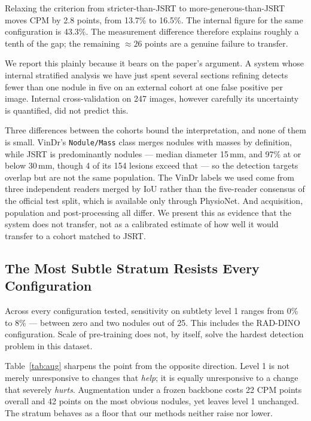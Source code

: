 \documentclass[11pt,a4paper]{article}
\begin{document}
Relaxing the criterion from stricter-than-JSRT to more-generous-than-JSRT moves
CPM by 2.8 points, from 13.7\% to 16.5\%. The internal figure for the same
configuration is 43.3\%. The measurement difference therefore explains roughly a
tenth of the gap; the remaining $\approx26$ points are a genuine failure to
transfer.

We report this plainly because it bears on the paper's argument. A system whose
internal stratified analysis we have just spent several sections refining
detects fewer than one nodule in five on an external cohort at one false
positive per image. Internal cross-validation on 247 images, however carefully
its uncertainty is quantified, did not predict this.

Three differences between the cohorts bound the interpretation, and none of them
is small. VinDr's \texttt{Nodule/Mass} class merges nodules with masses by
definition, while JSRT is predominantly nodules --- median diameter 15\,mm, and
97\% at or below 30\,mm, though 4 of its 154 lesions exceed that --- so the
detection targets overlap but are not the same population. The VinDr labels we used come from three independent readers
merged by IoU rather than the five-reader consensus of the official test split,
which is available only through PhysioNet. And acquisition, population and
post-processing all differ. We present this as evidence that the system does not
transfer, not as a calibrated estimate of how well it would transfer to a cohort
matched to JSRT.

\subsection{The Most Subtle Stratum Resists Every Configuration}
\label{sec:floor}

Across every configuration tested, sensitivity on subtlety level 1 ranges from
0\% to 8\% --- between zero and two nodules out of 25. This includes the
RAD-DINO configuration. Scale of pre-training does not, by itself, solve the
hardest detection problem in this dataset.

Table~\ref{tab:aug} sharpens the point from the opposite direction. Level 1 is
not merely unresponsive to changes that \emph{help}; it is equally unresponsive
to a change that severely \emph{hurts}. Augmentation under a frozen backbone
costs 22 CPM points overall and 42 points on the most obvious nodules, yet
leaves level 1 unchanged. The stratum behaves as a floor that our methods
neither raise nor lower.
\end{document}
